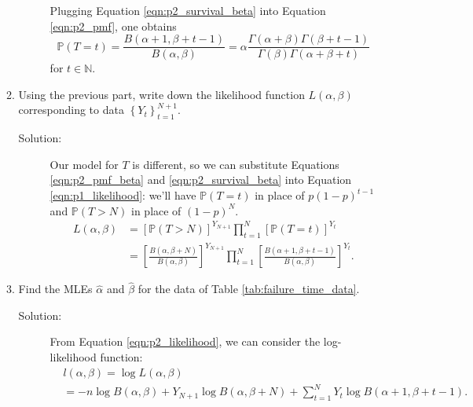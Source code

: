 \documentclass[letterpaper,11pt]{article}
\begin{document}
\begin{enumerate}
\begin{enumerate}
\begin{description}
        Plugging Equation \ref{eqn:p2_survival_beta} into Equation
        \ref{eqn:p2_pmf}, one obtains
        \begin{equation}
          \mathbb{P}\left(T = t\right)
          = \frac{B\left(\alpha + 1, \beta + t - 1\right)}{B\left(\alpha,\beta\right)}
          = \alpha
          \frac{\Gamma\left(\alpha + \beta\right)\Gamma\left(\beta + t - 1\right)}
          {\Gamma\left(\beta\right)\Gamma\left(\alpha + \beta + t\right)}
          \label{eqn:p2_pmf_beta}
        \end{equation}
        for $t \in \mathbb{N}$.
      \end{description}
    \item Using the previous part, write down the likelihood function
      $L\left(\alpha, \beta\right)$ corresponding to data
      $\left\{Y_t\right\}_{t=1}^{N+1}$.

      \begin{description}
      \item[Solution:] Our model for $T$ is different, so we can substitute
        Equations \ref{eqn:p2_pmf_beta} and \ref{eqn:p2_survival_beta} into
        Equation \ref{eqn:p1_likelihood}: we'll have
        $\mathbb{P}\left(T = t\right)$ in place of $p\left(1 - p\right)^{t-1}$
        and $\mathbb{P}\left(T > N\right)$ in place of $\left(1 - p\right)^N$.
        \begin{align}
          L\left(\alpha,\beta\right)
          &= \left[\mathbb{P}\left(T > N\right)\right]^{Y_{N+1}}
            \prod_{t=1}^N\left[\mathbb{P}\left(T = t\right)\right]^{Y_t}
            \label{eqn:p2_likelihood} \\
          &= \left[
            \frac{B\left(\alpha, \beta + N\right)}{B\left(\alpha, \beta\right)}
            \right]^{Y_{N+1}}
            \prod_{t=1}^N \left[
            \frac{B\left(\alpha + 1, \beta + t - 1\right)}
            {B\left(\alpha, \beta\right)}
            \right]^{Y_t}.
            \nonumber
        \end{align}
      \end{description}
    \item Find the MLEs  $\hat\alpha$ and $\hat\beta$ for the data of Table
      \ref{tab:failure_time_data}.
      \begin{description}
      \item[Solution:] From Equation \ref{eqn:p2_likelihood}, we can consider
        the log-likelihood function:
        \begin{align}
          &l\left(\alpha,\beta\right)
          =
          \log L\left(\alpha,\beta\right)
          \label{eqn:p2_log_likelihood} \\
          &= -n\log B\left(\alpha,\beta\right)
            +
            Y_{N+1}\log B\left(\alpha,\beta+N\right)
            +
            \sum_{t=1}^N Y_t\log 
            B\left(\alpha + 1, \beta + t - 1 \right).
            \nonumber
        \end{align}


\end{description}
\end{enumerate}
\end{enumerate}
\end{document}
